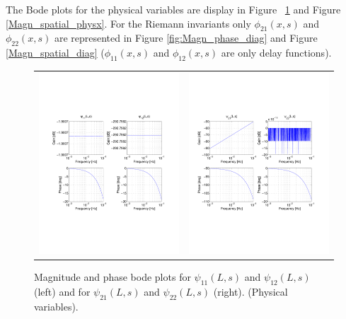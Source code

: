\documentclass[preprint]{elsarticle}
\begin{document}
The Bode plots for the physical variables are display in Figure ~\ref{fig:Magn_phase_physx} and Figure \ref{Magn_spatial_physx}. For the Riemann invariants only $\phi_{21}(x,s)$ and $\phi_{22}(x,s)$ are represented in Figure \ref{fig:Magn_phase_diag} and Figure \ref{Magn_spatial_diag} ($\phi_{11}(x,s)$ and $\phi_{12}(x,s)$ are only delay functions).

\begin{figure}
\centering
\begin{tabular}{cc}
\includegraphics[trim = 0mm 60mm 0mm 60mm, width=8cm]{IOv_-3to-1}
& 
\includegraphics[trim = 0mm 60mm 0mm 60mm, width=8cm]{IOq_-3to-1}
\tabularnewline
\end{tabular}
\caption{
Magnitude and phase bode plots for $\psi_{11}(L,s)$ and $\psi_{12}(L,s)$ (left) and for $\psi_{21}(L,s)$ and $\psi_{22}(L,s)$ (right). (Physical variables).
\label{fig:Magn_phase_physx}
}
\end{figure}
\end{document}
